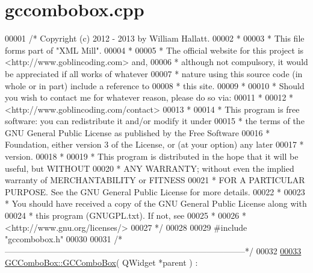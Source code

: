 \hypertarget{gccombobox_8cpp_source}{\section{gccombobox.\-cpp}
}

\begin{DoxyCode}
00001 \textcolor{comment}{/* Copyright (c) 2012 - 2013 by William Hallatt.}
00002 \textcolor{comment}{ *}
00003 \textcolor{comment}{ * This file forms part of "XML Mill".}
00004 \textcolor{comment}{ *}
00005 \textcolor{comment}{ * The official website for this project is <http://www.goblincoding.com> and,}
00006 \textcolor{comment}{ * although not compulsory, it would be appreciated if all works of whatever}
00007 \textcolor{comment}{ * nature using this source code (in whole or in part) include a reference to}
00008 \textcolor{comment}{ * this site.}
00009 \textcolor{comment}{ *}
00010 \textcolor{comment}{ * Should you wish to contact me for whatever reason, please do so via:}
00011 \textcolor{comment}{ *}
00012 \textcolor{comment}{ *                 <http://www.goblincoding.com/contact>}
00013 \textcolor{comment}{ *}
00014 \textcolor{comment}{ * This program is free software: you can redistribute it and/or modify it
       under}
00015 \textcolor{comment}{ * the terms of the GNU General Public License as published by the Free
       Software}
00016 \textcolor{comment}{ * Foundation, either version 3 of the License, or (at your option) any later}
00017 \textcolor{comment}{ * version.}
00018 \textcolor{comment}{ *}
00019 \textcolor{comment}{ * This program is distributed in the hope that it will be useful, but WITHOUT}
00020 \textcolor{comment}{ * ANY WARRANTY; without even the implied warranty of MERCHANTABILITY or
       FITNESS}
00021 \textcolor{comment}{ * FOR A PARTICULAR PURPOSE.  See the GNU General Public License for more
       details.}
00022 \textcolor{comment}{ *}
00023 \textcolor{comment}{ * You should have received a copy of the GNU General Public License along with}
00024 \textcolor{comment}{ * this program (GNUGPL.txt).  If not, see}
00025 \textcolor{comment}{ *}
00026 \textcolor{comment}{ *                    <http://www.gnu.org/licenses/>}
00027 \textcolor{comment}{ */}
00028 
00029 \textcolor{preprocessor}{#include "gccombobox.h"}
00030 
00031 \textcolor{comment}{/*
      --------------------------------------------------------------------------------------*/}
00032 
\hypertarget{gccombobox_8cpp_source_l00033}{}\hyperlink{class_g_c_combo_box_ab4d6f4af3941fe4d71eab7d8f78ac6c1}{00033} \hyperlink{class_g_c_combo_box_ab4d6f4af3941fe4d71eab7d8f78ac6c1}{GCComboBox::GCComboBox}( QWidget *parent ) :

\end{DoxyCode}
